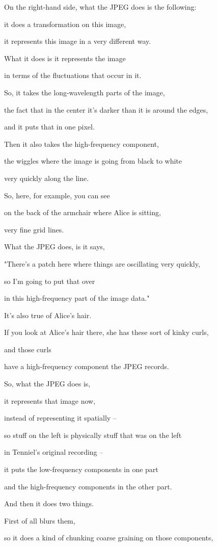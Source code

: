 \documentclass[]{article}
\begin{document}
On the right-hand side,
what the JPEG does is the following:

it does a transformation on this image,

it represents this image
in a very different way.

What it does is it represents the image

in terms of the fluctuations
that occur in it.

So, it takes the long-wavelength
parts of the image,

the fact that in the center
it's darker than it is around the edges,

and it puts that in one pixel.

Then it also takes
the high-frequency component,

the wiggles where the image is going
from black to white

very quickly along the line.

So, here, for example, you can see

on the back of the armchair
where Alice is sitting,

very fine grid lines.

What the JPEG does, is it says,

"There's a patch here where things
are oscillating very quickly,

so I'm going to put that over

in this high-frequency part
of the image data."

It's also true of Alice's hair.

If you look at Alice's hair there,
she has these sort of kinky curls,

and those curls

have a high-frequency component
the JPEG records.

So, what the JPEG does is,

it represents that image now,

instead of representing it spatially –

so stuff on the left
is physically stuff that was on the left

in Tenniel's original recording –

it puts the low-frequency components
in one part

and the high-frequency components
in the other part.

And then it does two things.

First of all blurs them,

so it does a kind of chunking
coarse graining on those components,
\end{document}
